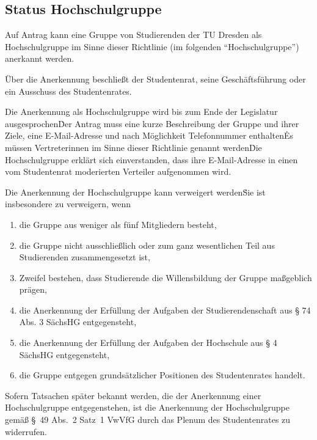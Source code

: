 \setcounter{section}{0} %
\begin{multicols}{2}




\section{Status Hochschulgruppe}

\Abs \Satz Auf Antrag kann eine Gruppe von Studierenden der TU Dresden als Hochschulgruppe im Sinne dieser Richtlinie (im folgenden "`Hochschulgruppe"') anerkannt werden.

\Abs \Satz Über die Anerkennung beschließt der Studentenrat, seine Geschäftsführung oder ein Ausschuss des Studentenrates.

\Abs \Satz Die Anerkennung als Hochschulgruppe wird bis zum Ende der Legislatur ausgesprochen\. Der Antrag muss eine kurze Beschreibung der Gruppe und ihrer Ziele, eine E-Mail-Adresse und nach Möglichkeit Telefonnummer enthalten\. Es müssen Vertreterinnen im Sinne dieser Richtlinie genannt werden\. Die Hochschulgruppe erklärt sich einverstanden, dass ihre E-Mail-Adresse in einen vom Studentenrat moderierten Verteiler aufgenommen wird.

\Abs \Satz Die Anerkennung der Hochschulgruppe kann verweigert werden\. Sie ist insbesondere zu verweigern, wenn 
\begin{enumerate}
\item die Gruppe aus weniger als fünf Mitgliedern besteht,
\item die Gruppe nicht ausschließlich oder zum ganz wesentlichen Teil aus Studierenden zusammengesetzt ist,
\item Zweifel bestehen, dass Studierende die Willensbildung der Gruppe maßgeblich prägen,
\item die Anerkennung der Erfüllung der Aufgaben der Studierendenschaft aus § 74 Abs. 3 SächsHG entgegensteht,
\item die Anerkennung der Erfüllung der Aufgaben der Hochschule aus § 4 SächsHG entgegensteht,
\item die Gruppe entgegen grundsätzlicher Positionen des Studentenrates handelt.
\end{enumerate}
\Satz Sofern Tatsachen später bekannt werden, die der Anerkennung einer Hochschulgruppe entgegenstehen, ist die Anerkennung der Hochschulgruppe gemäß §~49 Abs.~2 Satz~1 VwVfG durch das Plenum des Studentenrates zu widerrufen.


\end{multicols}
